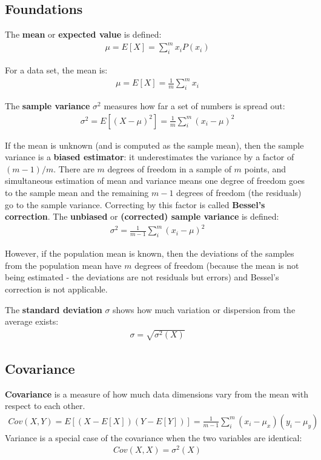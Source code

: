 \documentclass{report}
\begin{document}
\subsection{Foundations}
The {\bf mean} or {\bf expected value} is defined:
\begin{align*}
\mu = E[X] = \sum_i^m x_iP(x_i)
\end{align*}

For a data set, the mean is:
\begin{align*}
\mu = E[X] = \frac{1}{m}\sum_i^m x_i
\end{align*}

The {\bf sample variance} $\sigma^2$ measures how far a set of numbers is spread out:
\begin{align*}
\sigma^2 = E[(X-\mu)^2] = \frac{1}{m}\sum_i^m (x_i-\mu)^2
\end{align*}

If the mean is unknown (and is computed as the sample mean), then the sample variance is a {\bf biased estimator}: it underestimates the variance by a factor of $(m - 1) / m$.
There are $m$ degrees of freedom in a sample of $m$ points, and simultaneous estimation of mean and variance means one degree of freedom goes to the sample mean and the remaining $m - 1$ degrees of freedom (the residuals) go to the sample variance.
Correcting by this factor is called {\bf Bessel's correction}. The {\bf unbiased} or {\bf (corrected) sample variance} is defined:
\begin{align*}
\sigma^2 = \frac{1}{m-1}\sum_i^m (x_i-\mu)^2
\end{align*}

However, if the population mean is known, then the deviations of the samples from the population mean have $m$ degrees of freedom (because the mean is not being estimated - the deviations are not residuals but errors) and Bessel's correction is not applicable.


The {\bf standard deviation} $\sigma$ shows how much variation or dispersion from the average exists:
\begin{align*}
\sigma = \sqrt{\sigma^2(X)}
\end{align*}

\subsection{Covariance}
{\bf Covariance} is a measure of how much data dimensions vary from the mean with respect to each other.
\begin{align*}
Cov(X,Y) = E[(X-E[X])(Y-E[Y])] = \frac{1}{m-1}\sum_i^m (x_i-\mu_x)(y_i-\mu_y)
\end{align*}
Variance is a special case of the covariance when the two variables are identical:
\begin{align*}
Cov(X,X) = \sigma^2(X)
\end{align*}
\end{document}
